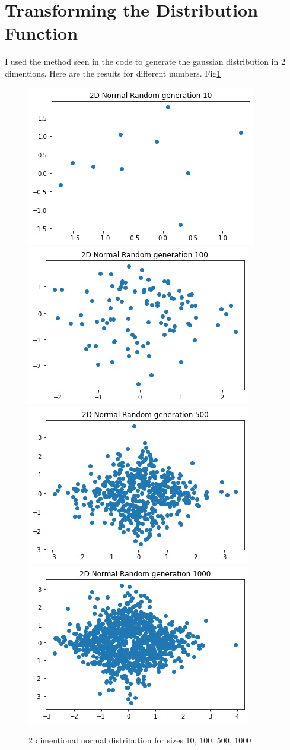 \documentclass[12pt]{article}
\begin{document}
	\section{Transforming the Distribution Function}
	I used the method seen in the code to generate the gaussian distribution in 2 dimentions.
	Here are the results for different numbers. Fig\ref{fig:p4}
	\begin{figure}[h!]
		\centering
		\includegraphics[width=.45\linewidth]{../p4_10}
		\includegraphics[width=.45\linewidth]{../p4_100}
		\includegraphics[width=.45\linewidth]{../p4_500}
		\includegraphics[width=.45\linewidth]{../p4_1000}
		\label{fig:p4}
		\caption{2 dimentional normal distribution for sizes 10, 100, 500, 1000}
	\end{figure}


	
	
	
	
	
\end{document}
